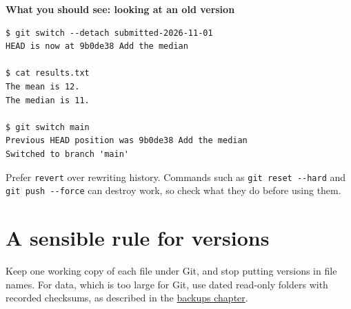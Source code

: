 \textbf{What you should see: looking at an old version}

\begin{lstlisting}[language=text]
$ git switch --detach submitted-2026-11-01
HEAD is now at 9b0de38 Add the median

$ cat results.txt
The mean is 12.
The median is 11.

$ git switch main
Previous HEAD position was 9b0de38 Add the median
Switched to branch 'main'
\end{lstlisting}

Prefer \texttt{revert} over rewriting history. Commands such as \texttt{git\ reset\ -\/-hard} and \texttt{git\ push\ -\/-force} can destroy work, so check what they do before using them.

\section{A sensible rule for versions}\label{a-sensible-rule-for-versions}

Keep one working copy of each file under Git, and stop putting versions in file names. For data, which is too large for Git, use dated read-only folders with recorded checksums, as described in the \href{../backups/}{backups chapter}.

